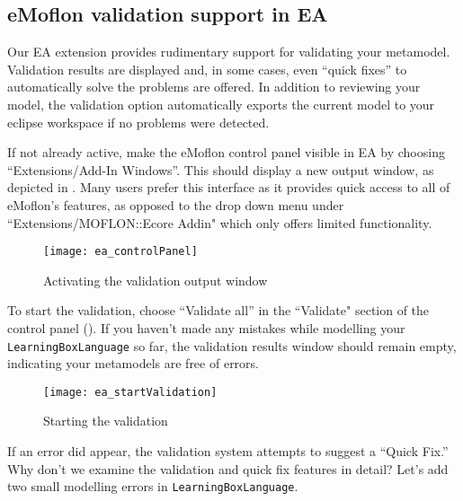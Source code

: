\newpage
\genHeader
\hypertarget{validation vis}{} 
\subsection{eMoflon validation support in EA}
\label{sec:EAExport}

Our EA extension provides rudimentary support for validating your metamodel. Validation results are displayed and, in some cases, even ``quick fixes'' to
automatically solve the problems are offered. In addition to reviewing your model, the validation option automatically exports the current model to your eclipse
workspace if no problems were detected.

\begin{stepbystep}
\item If not already active, make the eMoflon control panel visible in EA by choosing ``Extensions/\-Add-In Windows''. This should
display a new output window, as depicted in .
Many users prefer this interface as it provides quick access to all of eMoflon's features, as opposed to the drop down menu under ``Extensions/MOFLON::Ecore Addin" which only offers limited functionality.

\begin{figure}[htbp]
	\centering
  \texttt{[image: ea\_controlPanel]}
	\caption{Activating the validation output window}
	\label{ea:validation_output}
\end{figure}
\FloatBarrier

\clearpage
\item To start the validation, choose ``Validate all'' in the ``Validate" section of the control panel
(). If you haven't made any mistakes while modelling your \texttt{LearningBoxLanguage} so far, the validation results window
should remain empty, indicating your metamodels are free of errors.

\begin{figure}[htbp]
	\centering
  \texttt{[image: ea\_startValidation]}
	\caption{Starting the validation}
	\label{ea:validation_menu}
\end{figure}
\FloatBarrier
\end{stepbystep}

If an error did appear, the validation system attempts to suggest a ``Quick Fix.'' Why don't we examine the validation and quick fix features in detail? Let's
add two small modelling errors in \texttt{LearningBoxLanguage}.

